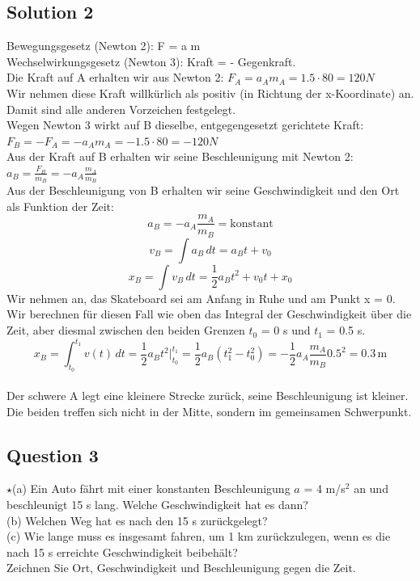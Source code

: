 \documentclass{article}
\begin{document}
\subsection*{Solution 2}
Bewegungsgesetz (Newton 2): F = a m\\
Wechselwirkungsgesetz (Newton 3): Kraft = - Gegenkraft.\\
Die Kraft auf A erhalten wir aus Newton 2: $F_A=a_Am_A=1.5\cdot80=120N$\\
Wir nehmen diese Kraft willkürlich als positiv (in Richtung der x-Koordinate) an. Damit sind alle anderen Vorzeichen festgelegt.\\
Wegen Newton 3 wirkt auf B dieselbe, entgegengesetzt gerichtete Kraft: $F_B=-F_A=-a_Am_A=-1.5\cdot80=-120N$\\
Aus der Kraft auf B erhalten wir seine Beschleunigung mit Newton 2: \\
$a_B=\frac{F_B}{m_B}=-a_A\frac{m_A}{m_B}$\\Aus der Beschleunigung von B erhalten wir seine Geschwindigkeit und den Ort als Funktion der Zeit:
\[
a_B = -a_A \frac{m_A}{m_B} = \text{konstant}
\]
\[
v_B = \int a_B \, dt = a_B t + v_0
\]
\[
x_B = \int v_B \, dt = \frac{1}{2} a_B t^2 + v_0 t + x_0
\]
Wir nehmen an, das Skateboard sei am Anfang in Ruhe und am Punkt x = 0.\\
Wir berechnen für diesen Fall wie oben das Integral der Geschwindigkeit über die Zeit, aber diesmal zwischen den beiden Grenzen $t_0$ = 0 s und $t_1$ = 0.5 s.\\\[
x_B = \int_{t_0}^{t_1} v(t) \, dt = \frac{1}{2} a_B t^2 \Big|_{t_0}^{t_1} = \frac{1}{2} a_B (t_1^2 - t_0^2) = -\frac{1}{2} a_A \frac{m_A}{m_B} 0.5^2 = 0.3\, \text{m}
\]\\Der schwere A legt eine kleinere Strecke zurück, seine Beschleunigung ist kleiner. Die beiden treffen sich nicht in der Mitte, sondern im gemeinsamen Schwerpunkt.
\subsection*{Question 3}
$\star$(a) Ein Auto fährt mit einer konstanten Beschleunigung $a$ = 4 m/s$^2$ an und beschleunigt 15 s lang. Welche Geschwindigkeit hat es dann?\\
(b) Welchen Weg hat es nach den 15 s zurückgelegt?\\
(c) Wie lange muss es insgesamt fahren, um 1 km zurückzulegen, wenn es die nach 15 s erreichte Geschwindigkeit beibehält?\\
Zeichnen Sie Ort, Geschwindigkeit und Beschleunigung gegen die Zeit.
\end{document}
